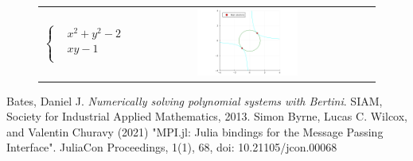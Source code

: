 \documentclass[a4paper]{article}
\theoremstyle{definition}
\theoremstyle{definition}
\theoremstyle{remark}
\theoremstyle{definition}
\begin{document}
\begin{figure}[htb]
\begin{tabular}{c c c}
        $\left\{\begin{aligned}
                    &x^2 + y^2 - 2 \\
                    &xy - 1 \\
        \end{aligned}\right.$ &
        \includegraphics[width=0.45\textwidth,valign=c]{../plots/solutions4_6.png} \\
    \end{tabular}
\end{figure}

\restoregeometry

 Bates, Daniel J. \textit{Numerically solving polynomial systems with Bertini}. SIAM, Society for Industrial Applied Mathematics, 2013.
 Simon Byrne, Lucas C. Wilcox, and Valentin Churavy (2021) "MPI.jl: Julia bindings for the Message Passing Interface". JuliaCon Proceedings, 1(1), 68, doi: 10.21105/jcon.00068
\end{document}
